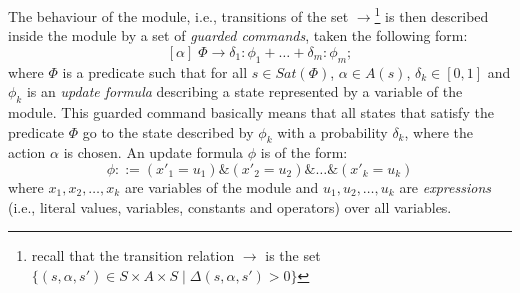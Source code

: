 The behaviour of the module, i.e., transitions of the set $\rightarrow$\footnote{recall that the transition relation $\rightarrow$ is the set $\{ (s, \alpha, s') \in S \times A \times S \; | \; \Delta(s, \alpha, s') > 0 \}$} is then described
inside the module by a set of \textit{guarded commands}, taken the following form:
\[
  [\alpha] \; \Phi \rightarrow \delta_1: \phi_1 + \dots + \delta_m: \phi_m;
\]
where $\Phi$ is a predicate such that for all $s \in Sat(\Phi)$, $\alpha \in A(s)$, $\delta_k \in [0, 1]$ and $\phi_k$ is an \textit{update formula} describing a state represented by a variable of the module. This guarded command basically means that all states that satisfy the predicate $\Phi$ go to the state  described by $\phi_k$ with a probability $\delta_k$, where the action $\alpha$ is chosen.
An update formula $\phi$ is of the form:
\[\phi::=(x'_1=u_1) \& (x'_2=u_2) \& \dots \& (x'_k=u_k)\]
where $x_1, x_2, \dots, x_k$ are variables of the module and $u_1, u_2, \dots, u_k$ are \textit{expressions} (i.e., literal values, variables, constants and operators) over all variables.
